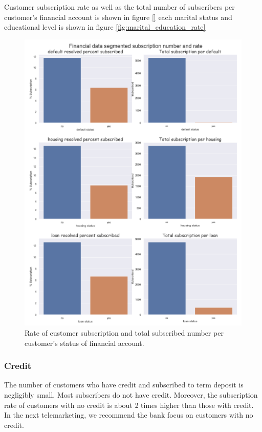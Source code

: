 Customer subscription rate as well as the total number of subscribers per customer's financial account is shown in figure \ref{} each marital status and educational level is shown in figure \ref{fig:marital_education_rate}
\begin{figure}[tbh]
\centering
\includegraphics[width = 1.0\hsize]{./resources/img/fig_financial_rate.png}
\caption{Rate of customer subscription and total subscribed number per customer's status of financial account.} 
\label{fig:financial_rate}
\end{figure}

\subsubsection*{Credit}
The number of customers who have credit and subscribed to term deposit is negligibly small. Most subscribers do not have credit. Moreover, the subscription rate of customers with no credit is about 2 times higher than those with credit. In the next telemarketing, we recommend the bank focus on customers with no credit.

